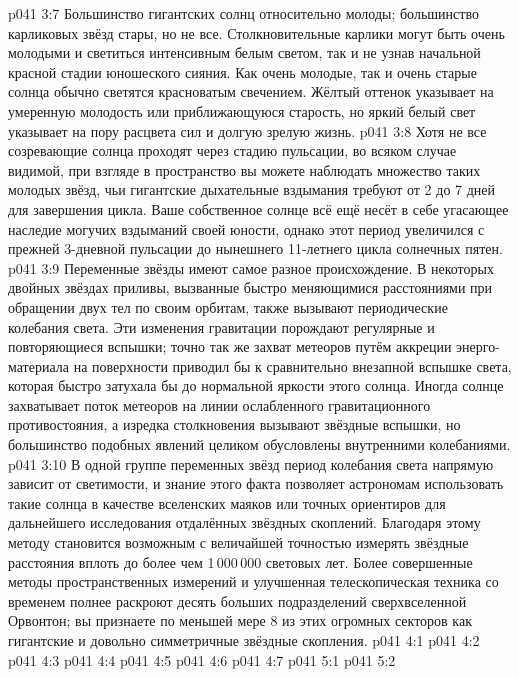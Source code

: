 \vs p041 3:7 Большинство гигантских солнц относительно молоды; большинство карликовых звёзд стары, но не все. Столкновительные карлики могут быть очень молодыми и светиться интенсивным белым светом, так и не узнав начальной красной стадии юношеского сияния. Как очень молодые, так и очень старые солнца обычно светятся красноватым свечением. Жёлтый оттенок указывает на умеренную молодость или приближающуюся старость, но яркий белый свет указывает на пору расцвета сил и долгую зрелую жизнь.
\vs p041 3:8 \pc Хотя не все созревающие солнца проходят через стадию пульсации, во всяком случае видимой, при взгляде в пространство вы можете наблюдать множество таких молодых звёзд, чьи гигантские дыхательные вздымания требуют от 2 до 7 дней для завершения цикла. Ваше собственное солнце всё ещё несёт в себе угасающее наследие могучих вздыманий своей юности, однако этот период увеличился с прежней 3-дневной пульсации до нынешнего 11-летнего цикла солнечных пятен.
\vs p041 3:9 Переменные звёзды имеют самое разное происхождение. В некоторых двойных звёздах приливы, вызванные быстро меняющимися расстояниями при обращении двух тел по своим орбитам, также вызывают периодические колебания света. Эти изменения гравитации порождают регулярные и повторяющиеся вспышки; точно так же захват метеоров путём аккреции энерго\hyp{}материала на поверхности приводил бы к сравнительно внезапной вспышке света, которая быстро затухала бы до нормальной яркости этого солнца. Иногда солнце захватывает поток метеоров на линии ослабленного гравитационного противостояния, а изредка столкновения вызывают звёздные вспышки, но большинство подобных явлений целиком обусловлены внутренними колебаниями.
\vs p041 3:10 В одной группе переменных звёзд период колебания света напрямую зависит от светимости, и знание этого факта позволяет астрономам использовать такие солнца в качестве вселенских маяков или точных ориентиров для дальнейшего исследования отдалённых звёздных скоплений. Благодаря этому методу становится возможным с величайшей точностью измерять звёздные расстояния вплоть до более чем 1\,000\,000 световых лет. Более совершенные методы пространственных измерений и улучшенная телескопическая техника со временем полнее раскроют десять больших подразделений сверхвселенной Орвонтон; вы признаете по меньшей мере 8 из этих огромных секторов как гигантские и довольно симметричные звёздные скопления.
\vs p041 4:1 
\vs p041 4:2 \pc 
\vs p041 4:3 \pc 
\vs p041 4:4 
\vs p041 4:5 
\vs p041 4:6 
\vs p041 4:7 
\vs p041 5:1 
\vs p041 5:2 
